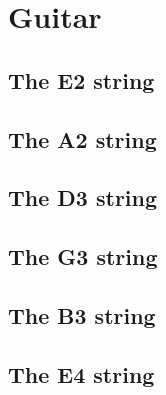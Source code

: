 \documentclass{article}
\begin{document}
\section{Guitar}

\subsection{The E2 string}

\subsection{The A2 string}

\subsection{The D3 string}

\subsection{The G3 string}

\subsection{The B3 string}

\subsection{The E4 string}
\end{document}
